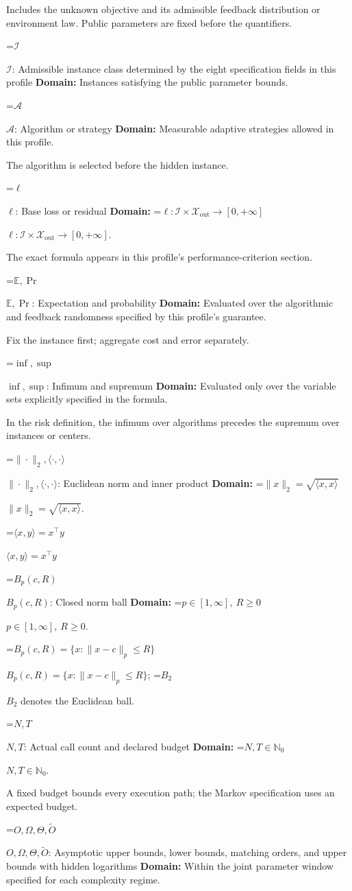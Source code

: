 \documentclass[10pt,a4paper]{article}
\newcommand{\AtlasMath}[1]{\par\begingroup\centering\setbox0=\hbox{$\displaystyle #1$}\ifdim\wd0>1.4\linewidth\typeout{ATLAS WIDE FORMULA: \the\wd0}\fi\ifdim\wd0>\linewidth\resizebox{\linewidth}{!}{\box0}\else\box0\fi\par\endgroup}
\newcommand{\AtlasInlineMath}[1]{\begingroup\setbox0=\hbox{$#1$}\ifdim\wd0>.4\linewidth\endgroup\AtlasMath{#1}\else\endgroup$#1$\fi}
\begin{document}
Includes the unknown objective and its admissible feedback distribution or environment law. Public parameters are fixed before the quantifiers.

\AtlasInlineMath{\mathcal{I}}: Admissible instance class determined by the eight specification fields in this profile \textbf{Domain:} Instances satisfying the public parameter bounds.

\AtlasInlineMath{\mathcal{A}}: Algorithm or strategy \textbf{Domain:} Measurable adaptive strategies allowed in this profile.

The algorithm is selected before the hidden instance.

\AtlasInlineMath{\ell}: Base loss or residual \textbf{Domain:} \AtlasInlineMath{\ell:\mathcal{I}\times\mathcal{X}_{\mathrm{out}}\to[0,+\infty]}.

The exact formula appears in this profile's performance-criterion section.

\AtlasInlineMath{\mathbb{E},\Pr}: Expectation and probability \textbf{Domain:} Evaluated over the algorithmic and feedback randomness specified by this profile's guarantee.

Fix the instance first; aggregate cost and error separately.

\AtlasInlineMath{\inf,\sup}: Infimum and supremum \textbf{Domain:} Evaluated only over the variable sets explicitly specified in the formula.

In the risk definition, the infimum over algorithms precedes the supremum over instances or centers.

\AtlasInlineMath{\|\cdot\|_2,\langle\cdot,\cdot\rangle}: Euclidean norm and inner product \textbf{Domain:} \AtlasInlineMath{\|x\|_2=\sqrt{\langle x,x\rangle}}.

\AtlasInlineMath{\langle x,y\rangle=x^\top y}

\AtlasInlineMath{B_p(c,R)}: Closed norm ball \textbf{Domain:} \AtlasInlineMath{p\in[1,\infty],\ R\ge0}.

\AtlasInlineMath{B_p(c,R)=\{x:\|x-c\|_p\le R\}}; \AtlasInlineMath{B_2} denotes the Euclidean ball.

\AtlasInlineMath{N,T}: Actual call count and declared budget \textbf{Domain:} \AtlasInlineMath{N,T\in\mathbb{N}_0}.

A fixed budget bounds every execution path; the Markov specification uses an expected budget.

\AtlasInlineMath{O,\Omega,\Theta,\widetilde{O}}: Asymptotic upper bounds, lower bounds, matching orders, and upper bounds with hidden logarithms \textbf{Domain:} Within the joint parameter window specified for each complexity regime.
\end{document}
